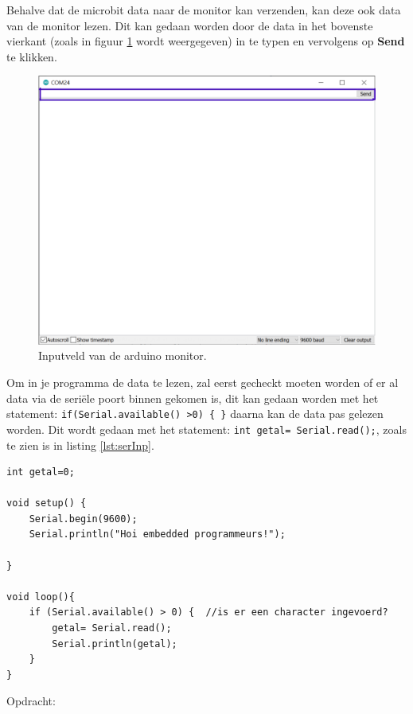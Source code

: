  Behalve dat de microbit data naar de monitor kan verzenden, kan deze ook data van de  monitor lezen.
 Dit kan gedaan worden door de data in het bovenste vierkant (zoals in figuur \ref{fig:ardMonRd} wordt weergegeven) in te typen en vervolgens op \textbf{Send} te klikken.
 \begin{figure}[h!]
 	\captionsetup{justification=centering}
 	\includegraphics[width=0.6 \linewidth]{figuren/arduinoMonRd}
 	\centering
 	\caption{Inputveld van de arduino monitor.}
 	\label{fig:ardMonRd}
 \end{figure}
Om in je programma de data te lezen, zal eerst gecheckt moeten worden of er al data via de seriële poort binnen gekomen is, dit kan gedaan worden met het statement:  \texttt{if(\textcolor{BurntOrange}{Serial.available}() \textgreater 0) \{ \}} daarna kan de data pas gelezen worden. 
Dit wordt gedaan met het statement:   \texttt{int getal=\textcolor{BurntOrange}{ Serial.read}();}, zoals te zien is in listing \ref{lst:serInp}.

\begin{lstlisting}[numbers=none ,caption= inlezen via de seriele poort.,label={lst:serInp}]	
int getal=0;

void setup() {  
	Serial.begin(9600);
	Serial.println("Hoi embedded programmeurs!");
	
}

void loop(){
	if (Serial.available() > 0) {  //is er een character ingevoerd?
		getal= Serial.read();
		Serial.println(getal);
	}
}
\end{lstlisting} 
 Opdracht:
 
